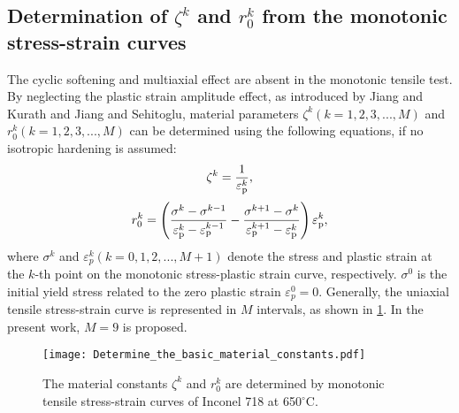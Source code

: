 \subsection{Determination of $\zeta^k$ and $r_0^k$ from the monotonic stress-strain curves}
The cyclic softening and multiaxial effect are absent in the monotonic tensile test.
By neglecting the plastic strain amplitude effect, as introduced by Jiang and Kurath\cite{Jiang1996387} and Jiang and Sehitoglu\cite{jiang1996modeling}, material parameters ${\zeta ^k}( k = 1,2,3,...,M )$ and $r_0^k( k = 1,2,3,...,M )$ can be determined using the following equations, if no isotropic hardening is assumed:
\begin{equation}
{\zeta ^k} = \frac{1}{{\varepsilon _{\rm{p}}^k}},
\label{Eqn:zetak}
\end{equation}
\begin{equation}
r_0^k = \left( {\frac{{\sigma _{}^k - \sigma _{}^{k - 1}}}{{\varepsilon _{\rm{p}}^k - \varepsilon _{\rm{p}}^{k - 1}}} - \frac{{\sigma _{}^{k + 1} - \sigma _{}^k}}{{\varepsilon _{\rm{p}}^{k + 1} - \varepsilon _{\rm{p}}^k}}} \right)\varepsilon _{\rm{p}}^k,
\end{equation}
where $\sigma^k$ and $\varepsilon_p^k( k = 0,1,2,...,M+1 )$ denote the stress and plastic strain at the $k$-th point on the monotonic  stress-plastic strain curve, respectively. $\sigma^0$ is the initial yield stress related to the zero plastic strain $\varepsilon_p^0=0$. Generally, the uniaxial tensile stress-strain curve is represented in $M$ intervals, as shown in \ref{Fig:Determine_the_basic_material_constants}. In the present work, $M=9$ is proposed.

\begin{figure}[!htp]
\centering
\texttt{[image: Determine\_the\_basic\_material\_constants.pdf]}
\caption{The material constants $\zeta^k$ and $r_0^k$ are determined by monotonic tensile stress-strain curves of Inconel 718 at 650$^{\circ}$C.}
\label{Fig:Determine_the_basic_material_constants}
\end{figure}

